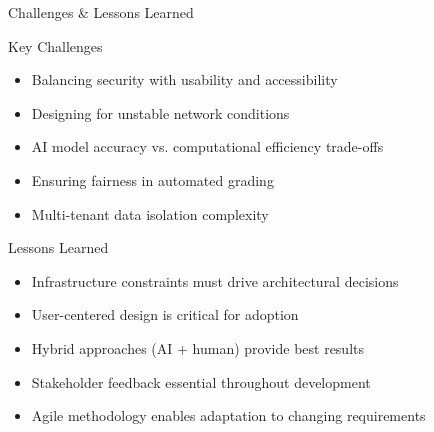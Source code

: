 \begin{frame}{Challenges \& Lessons Learned}
    \begin{block}{Key Challenges}
        \begin{itemize}
            \item Balancing security with usability and accessibility
            \item Designing for unstable network conditions
            \item AI model accuracy vs. computational efficiency trade-offs
            \item Ensuring fairness in automated grading
            \item Multi-tenant data isolation complexity
        \end{itemize}
    \end{block}
    
    \begin{block}{Lessons Learned}
        \begin{itemize}
            \item Infrastructure constraints must drive architectural decisions
            \item User-centered design is critical for adoption
            \item Hybrid approaches (AI + human) provide best results
            \item Stakeholder feedback essential throughout development
            \item Agile methodology enables adaptation to changing requirements
        \end{itemize}
    \end{block}
\end{frame}

